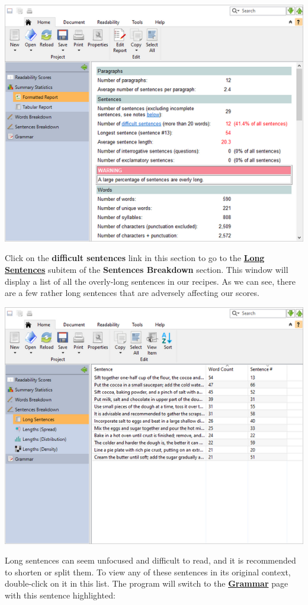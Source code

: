 \documentclass[
]{book}
\theoremstyle{definition}
\theoremstyle{definition}
\theoremstyle{definition}
\theoremstyle{definition}
\theoremstyle{remark}
\begin{document}
\includegraphics{Images/examplestats.png}

Click on the \textbf{difficult sentences} link in this section to go to the \protect\hyperlink{reviewing-sentences-breakdown}{\textbf{Long Sentences}} subitem of the \textbf{Sentences Breakdown} section. This window will display a list of all the overly-long sentences in our recipes. As we can see, there are a few rather long sentences that are adversely affecting our scores.

\includegraphics{Images/examplelongsentences.png}

Long sentences can seem unfocused and difficult to read, and it is recommended to shorten or split them. To view any of these sentences in its original context, double-click on it in this list. The program will switch to the \protect\hyperlink{reviewing-standard-grammar}{\textbf{Grammar}} page with this sentence highlighted:
\end{document}

